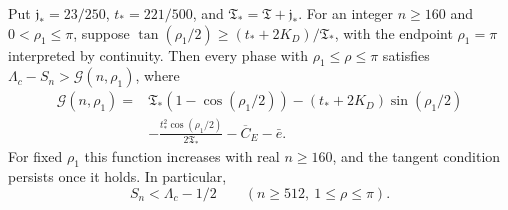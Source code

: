 \begin{corollary}\label{uc:absolute-gate}
Put $\mathfrak j_*=23/250$, $t_*=221/500$, and $\mathfrak T_*=\mathfrak T+\mathfrak j_*$.
For an integer $n\geq160$ and $0<\rho_1\leq\pi$, suppose
$\tan(\rho_1/2)\geq(t_*+2K_D)/\mathfrak T_*$, with the endpoint
$\rho_1=\pi$ interpreted by continuity. Then every phase with
$\rho_1\leq\rho\leq\pi$ satisfies
$\Lambda_c-S_n>\mathcal G(n,\rho_1)$, where
\begin{equation}\label{uc:absolute-gate-formula}
 \begin{aligned}
 \mathcal G(n,\rho_1)={}&\mathfrak T_*(1-\cos(\rho_1/2))
 -(t_*+2K_D)\sin(\rho_1/2)\\
 &-\frac{t_*^2\cos(\rho_1/2)}{2\mathfrak T_*}-\overline C_E-\bar e.
 \end{aligned}
\end{equation}
For fixed $\rho_1$ this function increases with real $n\geq160$,
and the tangent condition persists once it holds. In particular,
\begin{equation}\label{ul:outer-exclusion}
 S_n<\Lambda_c-1/2\qquad(n\geq512,\ 1\leq\rho\leq\pi).
\end{equation}
\end{corollary}
